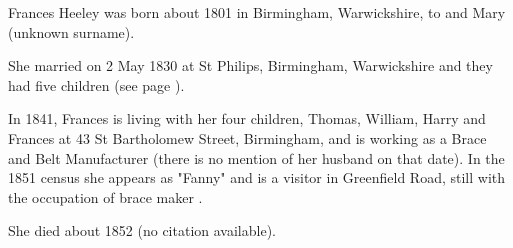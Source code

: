 
Frances Heeley was born about 1801 in Birmingham, Warwickshire, to  and Mary (unknown surname).

She married  on 2 May 1830 at St Philips, Birmingham, Warwickshire and they had five children (see page \pageref{Thomas_Elias_Hancox}).

In 1841, Frances is living with her four children, Thomas, William, Harry and Frances at 43 St Bartholomew Street, Birmingham,   and is working as a Brace and Belt Manufacturer  \cite{FrancesHeeleyWork} (there is no mention of her husband on that date).  In the 1851 census she appears as "Fanny" and is a visitor in Greenfield Road, still with the occupation of brace maker .

She died about 1852 (no citation available).
